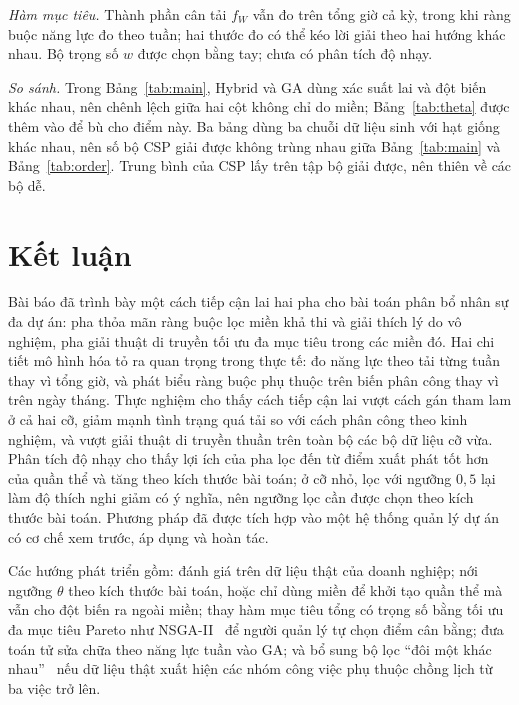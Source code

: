 \documentclass{IEEEtran}
\begin{document}
\textit{Hàm mục tiêu.} Thành phần cân tải $f_W$ vẫn đo trên tổng giờ cả kỳ, trong khi ràng buộc năng lực đo theo tuần; hai thước đo có thể kéo lời giải theo hai hướng khác nhau. Bộ trọng số $w$ được chọn bằng tay; chưa có phân tích độ nhạy.

\textit{So sánh.} Trong Bảng~\ref{tab:main}, Hybrid và GA dùng xác suất lai và đột biến khác nhau, nên chênh lệch giữa hai cột không chỉ do miền; Bảng~\ref{tab:theta} được thêm vào để bù cho điểm này. Ba bảng dùng ba chuỗi dữ liệu sinh với hạt giống khác nhau, nên số bộ CSP giải được không trùng nhau giữa Bảng~\ref{tab:main} và Bảng~\ref{tab:order}. Trung bình của CSP lấy trên tập bộ giải được, nên thiên về các bộ dễ.

\section{Kết luận}
\label{sec:conclusion}

Bài báo đã trình bày một cách tiếp cận lai hai pha cho bài toán phân bổ nhân sự đa dự án: pha thỏa mãn ràng buộc lọc miền khả thi và giải thích lý do vô nghiệm, pha giải thuật di truyền tối ưu đa mục tiêu trong các miền đó. Hai chi tiết mô hình hóa tỏ ra quan trọng trong thực tế: đo năng lực theo tải từng tuần thay vì tổng giờ, và phát biểu ràng buộc phụ thuộc trên biến phân công thay vì trên ngày tháng. Thực nghiệm cho thấy cách tiếp cận lai vượt cách gán tham lam ở cả hai cỡ, giảm mạnh tình trạng quá tải so với cách phân công theo kinh nghiệm, và vượt giải thuật di truyền thuần trên toàn bộ các bộ dữ liệu cỡ vừa. Phân tích độ nhạy cho thấy lợi ích của pha lọc đến từ điểm xuất phát tốt hơn của quần thể và tăng theo kích thước bài toán; ở cỡ nhỏ, lọc với ngưỡng $0{,}5$ lại làm độ thích nghi giảm có ý nghĩa, nên ngưỡng lọc cần được chọn theo kích thước bài toán. Phương pháp đã được tích hợp vào một hệ thống quản lý dự án có cơ chế xem trước, áp dụng và hoàn tác.

Các hướng phát triển gồm: đánh giá trên dữ liệu thật của doanh nghiệp; nới ngưỡng $\theta$ theo kích thước bài toán, hoặc chỉ dùng miền để khởi tạo quần thể mà vẫn cho đột biến ra ngoài miền; thay hàm mục tiêu tổng có trọng số bằng tối ưu đa mục tiêu Pareto như NSGA-II~\cite{deb2002} để người quản lý tự chọn điểm cân bằng; đưa toán tử sửa chữa theo năng lực tuần vào GA; và bổ sung bộ lọc ``đôi một khác nhau''~\cite{regin1994} nếu dữ liệu thật xuất hiện các nhóm công việc phụ thuộc chồng lịch từ ba việc trở lên.
\end{document}
